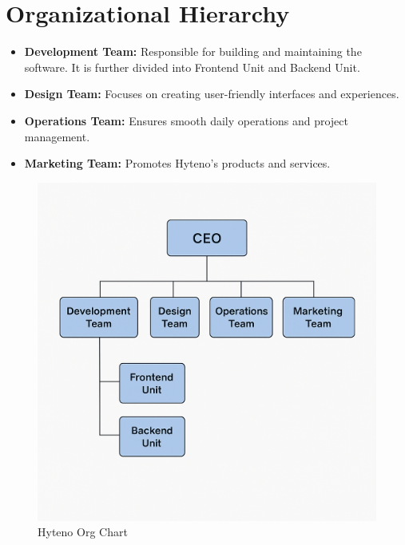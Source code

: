 \section{Organizational Hierarchy}

\begin{itemize}
    \item \textbf{Development Team:} Responsible for building and maintaining the software. It is further divided into Frontend Unit and Backend Unit.
    \item \textbf{Design Team:} Focuses on creating user-friendly interfaces and experiences.
    \item \textbf{Operations Team:} Ensures smooth daily operations and project management.
    \item \textbf{Marketing Team:} Promotes Hyteno’s products and services.
\end{itemize}

\begin{figure}[h]
  \centering
  \includegraphics[width=.85\linewidth]{contents/chapters/chapter2/images/Hierarchical-Structure.png}
  \caption{Hyteno Org Chart}\label{fig:example}
\end{figure}

